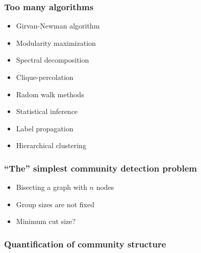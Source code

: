 \documentclass{beamer}
\begin{document}
\begin{frame}
    \frametitle{Too many algorithms}
    \centering
    \begin{itemize}
    \setlength\itemsep{1em}
        \item{Girvan-Newman algorithm}
        \item{Modularity maximization}
        \item{Spectral decomposition}
        \item{Clique-percolation}
        \item{Radom walk methods}
        \item{Statistical inference}
        \item{Label propagation}
        \item{Hierarchical clustering}
    \end{itemize}
\end{frame}
\begin{frame}
    \frametitle{``The'' simplest community detection problem}
    \centering
    \begin{itemize}
    \setlength\itemsep{1em}
        \item{Bisecting a graph with $n$ nodes}
        \item{Group sizes are not fixed}
        \item{Minimum cut size?}
    \end{itemize}
\end{frame}
\begin{frame}
    \frametitle{Quantification of community structure}
    \centering
\end{frame}
\begin{frame}
    \frametitle{}
    \centering
\end{frame}
\begin{frame}
    \frametitle{}
    \centering
\end{frame}
\begin{frame}
    \frametitle{}
    \centering
\end{frame}
\begin{frame}
    \frametitle{}
    \centering
\end{frame}
\end{document}
